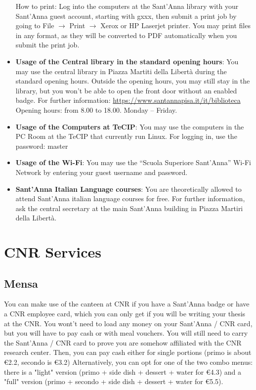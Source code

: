 \documentclass[11pt,fleqn,oneside]{book} %
\begin{document}
\begin{itemize}
How to print: Log into the computers at the Sant’Anna library with your Sant’Anna guest account, starting with gxxx, then submit a print job by going to File $\rightarrow$ Print $\rightarrow$ Xerox or HP Laserjet printer. You may print files in any format, as they will be converted to PDF automatically when you submit the print job. 
\item \textbf{Usage of the Central library in the standard opening hours}: You may use the central library in Piazza Martiti della Libertà during the standard opening hours. Outside the opening hours, you may still stay in the library, but you won’t be able to open the front door without an enabled badge. For further information: \url{https://www.santannapisa.it/it/biblioteca}
Opening hours:  from 8.00 to 18.00. Monday – Friday. 
\item \textbf{Usage of the Computers at TeCIP}: You may use the computers in the PC Room at the TeCIP that currently run Linux. For logging in, use the password: master
\item \textbf{Usage of the Wi-Fi}: You may use the “Scuola Superiore Sant’Anna” Wi-Fi Network by entering your guest username and password.
\item \textbf{Sant’Anna Italian Language courses}: You are theoretically allowed to attend Sant’Anna italian language courses for free. For further information, ask the central secretary at the main Sant’Anna building in Piazza Martiri della Libertà. 
\end{itemize}



\chapter{CNR Services}


\section{Mensa}

You can make use of the canteen at CNR if you have a Sant'Anna badge or have a CNR employee card, which you can only get if you will be writing your thesis at the CNR. You wont't need to load any money on your Sant'Anna / CNR card, but you will have to pay cash or with meal vouchers. You will still need to carry the Sant'Anna / CNR card to prove you are somehow affiliated with the CNR research center. Then, you can pay cash either for single portions (primo is about \euro 2.2, secondo is \euro 3.2) Alternatively, you can opt for one of the two combo menus: there is a "light" version (primo + side dish + dessert + water for \euro 4.3) and a "full" version (primo + secondo + side dish + dessert + water for \euro 5.5). 
\end{document}
